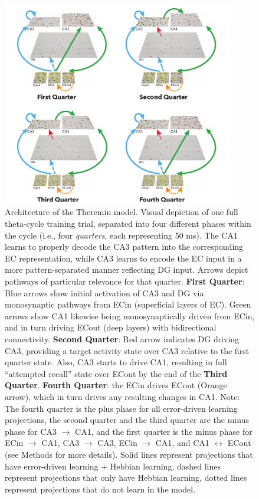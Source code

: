 \documentclass[11pt,twoside]{article}
\newif\myifpdf
\begin{document}
\begin{figure}
  \centering\includegraphics[width=4in]{fig_hip_edl_model_first_revision}
  \caption{\footnotesize Architecture of the Theremin model. Visual depiction of one full theta-cycle training trial, separated into four different phases within the cycle (i.e., four \emph{quarters}, each representing 50 ms).  The CA1 learns to properly decode the CA3 pattern into the corresponding EC representation, while CA3 learns to encode the EC input in a more pattern-separated manner reflecting DG input.  Arrows depict pathways of particular relevance for that quarter.  \textbf{First Quarter}: Blue arrows show initial activation of CA3 and DG via monosynaptic pathways from ECin (superficial layers of EC).  Green arrows show CA1 likewise being monosynaptically driven from ECin, and in turn driving ECout (deep layers) with bidirectional connectivity.  \textbf{Second Quarter}: Red arrow indicates DG driving CA3, providing a target activity state over CA3 relative to the first quarter state.  Also, CA3 starts to drive CA1, resulting in full ``attempted recall'' state over ECout by the end of the \textbf{Third Quarter}.  \textbf{Fourth Quarter}: the ECin drives ECout (Orange arrow), which in turn drives any resulting changes in CA1.  Note: The fourth quarter is the plus phase for all error-driven learning projections, the second quarter and the third quarter are the minus phase for CA3 $\rightarrow$ CA1, and the first quarter is the minus phase for ECin $\rightarrow$ CA1, CA3 $\rightarrow$ CA3, ECin $\rightarrow$ CA1, and CA1 $\leftrightarrow$ ECout (see Methods for more details).  Solid lines represent projections that have error-driven learning + Hebbian learning, dashed lines represent projections that only have Hebbian learning, dotted lines represent projections that do not learn in the model. }
\label{fig.theremin}
\end{figure}
\end{document}

